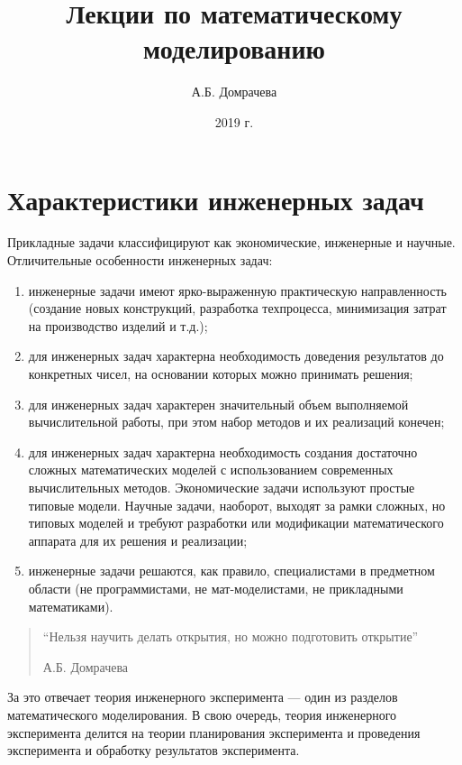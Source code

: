 \documentclass[12pt]{article}
\title{Лекции по математическому моделированию}
\author{А.Б. Домрачева}
\date{2019 г.}
\makeatletter
\def\maketitle{%
  \null
  \thispagestyle{empty}%
  \vfill
  \begin{center}\leavevmode
    \normalfont
    {\LARGE\raggedleft \@author\par}%
    \hrulefill\par
    {\huge\raggedright \@title\par}%
    \vskip 1cm
    {\Large \@date\par}%
  \end{center}%
  \vfill
  \null
  \cleardoublepage
  }
\makeatother
\begin{document}
\maketitle
\thispagestyle{empty}

\newpage
\tableofcontents
\thispagestyle{empty}

\newpage
\section{Характеристики инженерных задач}
Прикладные задачи классифицируют как экономические, инженерные и научные. Отличительные особенности инженерных задач:

\begin{enumerate}
    \item инженерные задачи имеют ярко-выраженную практическую направленность (создание новых конструкций, разработка техпроцесса, минимизация затрат на производство изделий и т.д.);
    \item для инженерных задач характерна необходимость доведения результатов до конкретных чисел, на основании которых можно принимать решения;
    \item для инженерных задач характерен значительный объем выполняемой вычислительной работы, при этом набор методов и их реализаций конечен;
    \item для инженерных задач характерна необходимость создания достаточно сложных математических моделей с использованием современных вычислительных методов. Экономические задачи используют простые типовые модели. Научные задачи, наоборот, выходят за рамки сложных, но типовых моделей и требуют разработки или модификации математического аппарата для их решения и реализации;
    \item инженерные задачи решаются, как правило, специалистами в предметном области (не программистами, не мат-моделистами, не прикладными математиками).
\end{enumerate}

\begin{quotation}
    \enquote{Нельзя научить делать открытия, но можно подготовить открытие}
    \begin{flushright}
        А.Б. Домрачева
    \end{flushright}
\end{quotation}

За это отвечает теория инженерного эксперимента --- один из разделов математического моделирования. В свою очередь, теория инженерного эксперимента делится на теории планирования эксперимента и проведения эксперимента и обработку результатов эксперимента.
\end{document}

